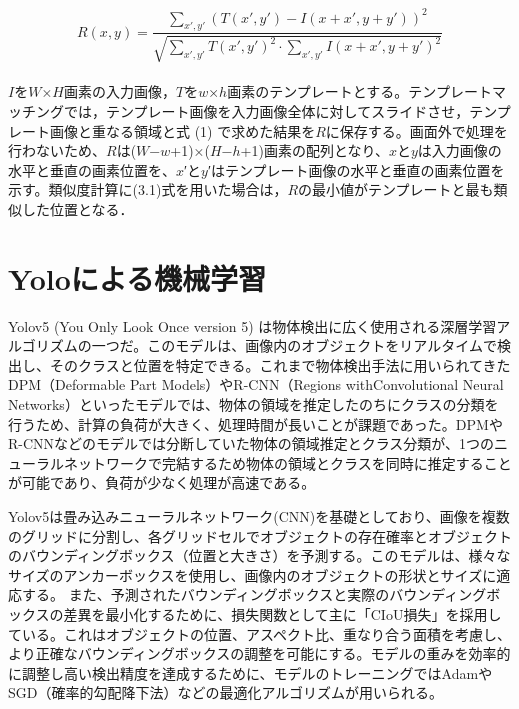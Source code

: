 \documentclass[11pt,a4j]{jreport}
\begin{document}
\begin{equation}
    R(x, y) = \frac{\sum_{x',y'} \left( T(x', y') - I(x + x', y + y') \right)^2}
    {\sqrt{\sum_{x',y'} T(x', y')^2 \cdot \sum_{x',y'} I(x + x', y + y')^2}}
\end{equation}\\
$I$を$W$×$H$画素の入力画像，$T$を$w$×$h$画素のテンプレートとする。テンプレートマッチングでは，テンプレート画像を入力画像全体に対してスライドさせ，テンプレート画像と重なる領域と式 (1) で求めた結果を$R$に保存する。画面外で処理を行わないため、$R$は($W$−$w$+1)×($H$−$h$+1)画素の配列となり、$x$と$y$は入力画像の水平と垂直の画素位置を、$x$′と$y$′はテンプレート画像の水平と垂直の画素位置を示す。類似度計算に(3.1)式を用いた場合は，$R$の最小値がテンプレートと最も類似した位置となる．

\section{Yoloによる機械学習}
Yolov5 (You Only Look Once version 5) は物体検出に広く使用される深層学習アルゴリズムの一つだ。\cite{yolo}このモデルは、画像内のオブジェクトをリアルタイムで検出し、そのクラスと位置を特定できる。これまで物体検出手法に用いられてきたDPM（Deformable Part Models）やR-CNN（Regions withConvolutional Neural Networks）といったモデルでは、物体の領域を推定したのちにクラスの分類を行うため、計算の負荷が大きく、処理時間が長いことが課題であった。DPMやR-CNNなどのモデルでは分断していた物体の領域推定とクラス分類が、1つのニューラルネットワークで完結するため物体の領域とクラスを同時に推定することが可能であり、負荷が少なく処理が高速である。

\noindent
Yolov5は畳み込みニューラルネットワーク(CNN)を基礎としており、画像を複数のグリッドに分割し、各グリッドセルでオブジェクトの存在確率とオブジェクトのバウンディングボックス（位置と大きさ）を予測する。このモデルは、様々なサイズのアンカーボックスを使用し、画像内のオブジェクトの形状とサイズに適応する。
また、予測されたバウンディングボックスと実際のバウンディングボックスの差異を最小化するために、損失関数として主に「CIoU損失」を採用している。これはオブジェクトの位置、アスペクト比、重なり合う面積を考慮し、より正確なバウンディングボックスの調整を可能にする。モデルの重みを効率的に調整し高い検出精度を達成するために、モデルのトレーニングではAdamやSGD（確率的勾配降下法）などの最適化アルゴリズムが用いられる。
\end{document}
